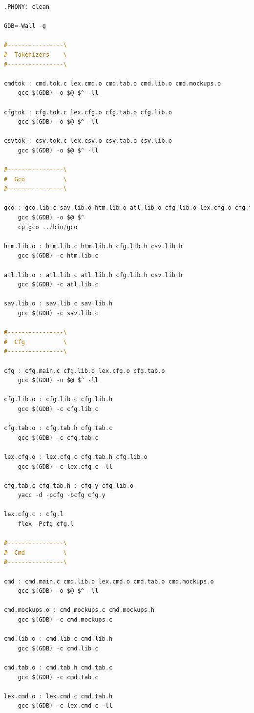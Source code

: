 \documentclass[11pt, a4paper, oneside]{article}
\begin{document}
\begin{lstlisting}[language=C, caption={Makefile }]
.PHONY: clean

GDB=-Wall -g

#----------------\
#  Tokenizers    \
#----------------\

cmdtok : cmd.tok.c lex.cmd.o cmd.tab.o cmd.lib.o cmd.mockups.o
	gcc $(GDB) -o $@ $^ -ll

cfgtok : cfg.tok.c lex.cfg.o cfg.tab.o cfg.lib.o
	gcc $(GDB) -o $@ $^ -ll

csvtok : csv.tok.c lex.csv.o csv.tab.o csv.lib.o
	gcc $(GDB) -o $@ $^ -ll

#----------------\
#  Gco           \
#----------------\

gco : gco.lib.c sav.lib.o htm.lib.o atl.lib.o cfg.lib.o lex.cfg.o cfg.tab.o cmd.lib.o lex.cmd.o cmd.tab.o csv.lib.o lex.csv.o csv.tab.o
	gcc $(GDB) -o $@ $^
	cp gco ../bin/gco

htm.lib.o : htm.lib.c htm.lib.h cfg.lib.h csv.lib.h
	gcc $(GDB) -c htm.lib.c

atl.lib.o : atl.lib.c atl.lib.h cfg.lib.h csv.lib.h
	gcc $(GDB) -c atl.lib.c

sav.lib.o : sav.lib.c sav.lib.h
	gcc $(GDB) -c sav.lib.c

#----------------\
#  Cfg           \
#----------------\

cfg : cfg.main.c cfg.lib.o lex.cfg.o cfg.tab.o
	gcc $(GDB) -o $@ $^ -ll

cfg.lib.o : cfg.lib.c cfg.lib.h
	gcc $(GDB) -c cfg.lib.c

cfg.tab.o : cfg.tab.h cfg.tab.c
	gcc $(GDB) -c cfg.tab.c

lex.cfg.o : lex.cfg.c cfg.tab.h cfg.lib.o
	gcc $(GDB) -c lex.cfg.c -ll

cfg.tab.c cfg.tab.h : cfg.y cfg.lib.o
	yacc -d -pcfg -bcfg cfg.y

lex.cfg.c : cfg.l
	flex -Pcfg cfg.l

#----------------\
#  Cmd           \
#----------------\

cmd : cmd.main.c cmd.lib.o lex.cmd.o cmd.tab.o cmd.mockups.o
	gcc $(GDB) -o $@ $^ -ll

cmd.mockups.o : cmd.mockups.c cmd.mockups.h
	gcc $(GDB) -c cmd.mockups.c

cmd.lib.o : cmd.lib.c cmd.lib.h
	gcc $(GDB) -c cmd.lib.c

cmd.tab.o : cmd.tab.h cmd.tab.c
	gcc $(GDB) -c cmd.tab.c

lex.cmd.o : lex.cmd.c cmd.tab.h
	gcc $(GDB) -c lex.cmd.c -ll


\end{lstlisting}
\end{document}
